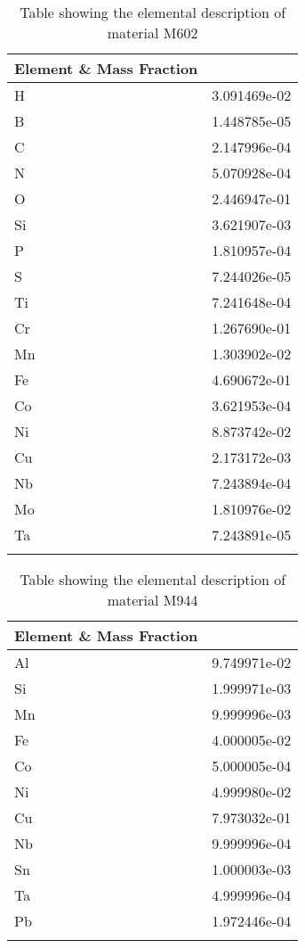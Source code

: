\begin{centering}
\begin{longtable}[ht!]
\caption{Table showing the elemental description of material M603}
\label{table:material_M603}
\end{longtable}
\clearpage

\begin{longtable}[ht!]
{ p{} | p{} }
\hline
Element \& Mass Fraction\\
\hline
H &  3.091469e-02\\
B &  1.448785e-05\\
C &  2.147996e-04\\
N &  5.070928e-04\\
O &  2.446947e-01\\
Si &  3.621907e-03\\
P &  1.810957e-04\\
S &  7.244026e-05\\
Ti &  7.241648e-04\\
Cr &  1.267690e-01\\
Mn &  1.303902e-02\\
Fe &  4.690672e-01\\
Co &  3.621953e-04\\
Ni &  8.873742e-02\\
Cu &  2.173172e-03\\
Nb &  7.243894e-04\\
Mo &  1.810976e-02\\
Ta &  7.243891e-05\\

\caption{Table showing the elemental description of material M602}
\label{table:material_M602}
\end{longtable}
\clearpage

\begin{longtable}[ht!]
{ p{} | p{} }
\hline
Element \& Mass Fraction\\
\hline
Al &  9.749971e-02\\
Si &  1.999971e-03\\
Mn &  9.999996e-03\\
Fe &  4.000005e-02\\
Co &  5.000005e-04\\
Ni &  4.999980e-02\\
Cu &  7.973032e-01\\
Nb &  9.999996e-04\\
Sn &  1.000003e-03\\
Ta &  4.999996e-04\\
Pb &  1.972446e-04\\
\caption{Table showing the elemental description of material M944}
\label{table:material_EPPDRW}
\end{longtable}
\clearpage


\end{centering}
